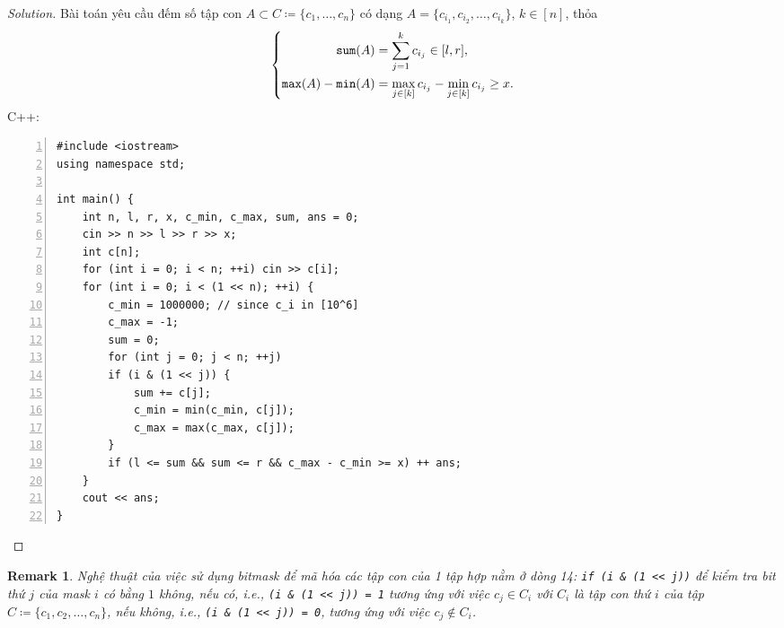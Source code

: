 \documentclass{article}
\newtheorem{remark}{Remark}
\begin{document}
\begin{proof}[Solution]
    Bài toán yêu cầu đếm số tập con $A\subset C\coloneqq\{c_1,\ldots,c_n\}$ có dạng $A = \{c_{i_1},c_{i_2},\ldots,c_{i_k}\}$, $k\in[n]$, thỏa
    \begin{equation*}
        \left\{\begin{split}
            {\tt sum}(A) &= \sum_{j=1}^k c_{i_j}\in[l,r],\\
            {\tt max}(A) - {\tt min}(A) &= \max_{j\in[k]} c_{i_j} - \min_{j\in[k]} c_{i_j}\ge x.
        \end{split}\right.
    \end{equation*}
    C++:
    \begin{Verbatim}[numbers=left,xleftmargin=5mm]
#include <iostream>
using namespace std;

int main() {
    int n, l, r, x, c_min, c_max, sum, ans = 0;
    cin >> n >> l >> r >> x;
    int c[n];
    for (int i = 0; i < n; ++i) cin >> c[i];
    for (int i = 0; i < (1 << n); ++i) {
        c_min = 1000000; // since c_i in [10^6]
        c_max = -1;
        sum = 0;
        for (int j = 0; j < n; ++j)
        if (i & (1 << j)) {
            sum += c[j];
            c_min = min(c_min, c[j]);
            c_max = max(c_max, c[j]);
        }
        if (l <= sum && sum <= r && c_max - c_min >= x) ++ ans;
    }
    cout << ans;
}
    \end{Verbatim}
\end{proof}

\begin{remark}
    Nghệ thuật của việc sử dụng bitmask để mã hóa các tập con của 1 tập hợp nằm ở dòng 14: \verb|if (i & (1 << j))| để kiểm tra bit thứ $j$ của mask $i$ có bằng $1$ không, nếu có, i.e., \verb|(i & (1 << j)) = 1| tương ứng với việc $c_j\in C_i$ với $C_i$ là tập con thứ $i$ của tập $C\coloneqq\{c_1,c_2,\ldots,c_n\}$, nếu không, i.e., \verb|(i & (1 << j)) = 0|, tương ứng với việc $c_j\notin C_i$.
\end{remark}
\end{document}
